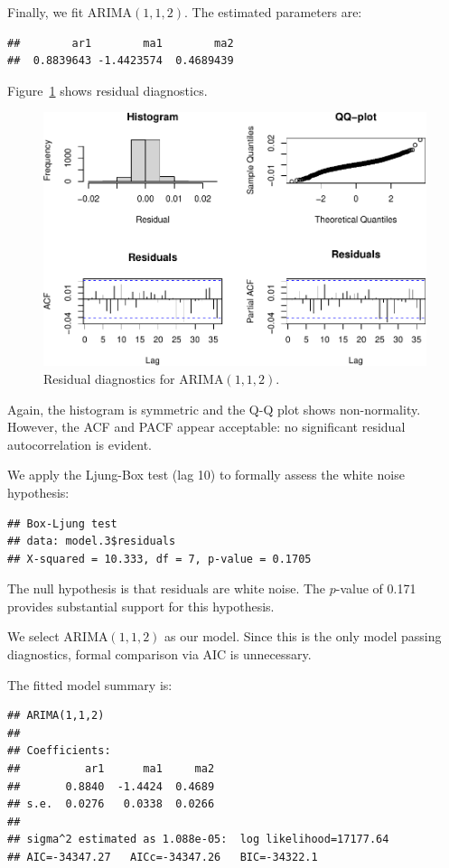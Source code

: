 \documentclass[final,11pt]{article}
\theoremstyle{plain}
\theoremstyle{remark}
\begin{document}
Finally, we fit ARIMA$(1,1,2)$. The estimated parameters are:

\begin{verbatim}
##        ar1        ma1        ma2
##  0.8839643 -1.4423574  0.4689439
\end{verbatim}

Figure~\ref{fig:res1} shows residual diagnostics.

\begin{figure}
\includegraphics{paper_files/figure-latex/unnamed-chunk-13-1.pdf}
\caption{Residual diagnostics for ARIMA$(1,1,2)$.}
\label{fig:res1}
\end{figure}

Again, the histogram is symmetric and the Q-Q plot shows non-normality.
However, the ACF and PACF appear acceptable: no significant residual
autocorrelation is evident.

We apply the Ljung-Box test (lag 10) to formally assess the white noise
hypothesis:

\begin{verbatim}
## Box-Ljung test
## data: model.3$residuals
## X-squared = 10.333, df = 7, p-value = 0.1705
\end{verbatim}

The null hypothesis is that residuals are white noise. The $p$-value of
0.171 provides substantial support for this hypothesis.

We select ARIMA$(1,1,2)$ as our model. Since this is the only model
passing diagnostics, formal comparison via AIC is unnecessary.

The fitted model summary is:

\begin{verbatim}
## ARIMA(1,1,2)
##
## Coefficients:
##          ar1      ma1     ma2
##       0.8840  -1.4424  0.4689
## s.e.  0.0276   0.0338  0.0266
##
## sigma^2 estimated as 1.088e-05:  log likelihood=17177.64
## AIC=-34347.27   AICc=-34347.26   BIC=-34322.1
\end{verbatim}
\end{document}
